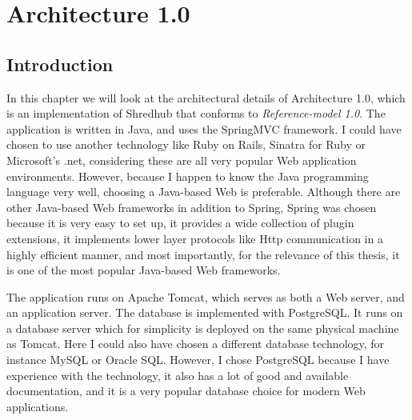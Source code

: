 \chapter{Architecture 1.0}

	
\section{Introduction}
In this chapter we will look at the architectural details of Architecture 1.0, which is an implementation of Shredhub that conforms to \textit{Reference-model 1.0}. The application is written in Java, and uses the SpringMVC framework. I could have chosen to use another technology like Ruby on Rails, Sinatra for Ruby or Microsoft's .net, considering these are all very popular Web application environments. However, because I happen to know the Java programming language very well, choosing a Java-based Web is preferable. Although there are other Java-based Web frameworks in addition to Spring, Spring was chosen because it is very easy to set up, it provides a wide collection of plugin extensions, it implements lower layer protocols like Http communication in a highly efficient manner, and most importantly, for the relevance of this thesis, it is one of the most popular Java-based Web frameworks.  

The application runs on Apache Tomcat, which serves as both a Web server, and an application server. The database is implemented with PostgreSQL. It runs on a database server which for simplicity is deployed on the same physical machine as Tomcat. Here I could also have chosen a different database technology, for instance MySQL or Oracle SQL. However, I chose PostgreSQL because I have experience with the technology, it also has a lot of good and available documentation, and it is a very popular database choice for modern Web applications. \cite{popularDB}


